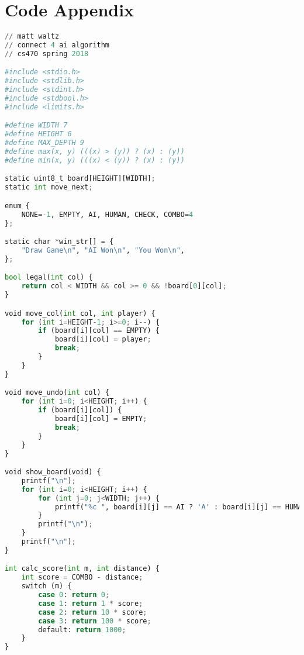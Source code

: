 \documentclass[11pt,letterpaper]{article}
\begin{document}
\section{Code Appendix}
\begin{lstlisting}[language=Python]
// matt waltz
// connect 4 ai algorithm
// cs470 spring 2018

#include <stdio.h>
#include <stdlib.h>
#include <stdint.h>
#include <stdbool.h>
#include <limits.h>

#define WIDTH 7
#define HEIGHT 6
#define MAX_DEPTH 9
#define max(x, y) (((x) > (y)) ? (x) : (y))
#define min(x, y) (((x) < (y)) ? (x) : (y))

static uint8_t board[HEIGHT][WIDTH];
static int move_next;

enum {
    NONE=-1, EMPTY, AI, HUMAN, CHECK, COMBO=4
};

static char *win_str[] = {
    "Draw Game\n", "AI Won\n", "You Won\n",
};

bool legal(int col) {
    return col < WIDTH && col >= 0 && !board[0][col];
}

void move_col(int col, int player) {
    for (int i=HEIGHT-1; i>=0; i--) {
        if (board[i][col] == EMPTY) {
            board[i][col] = player;
            break;
        }
    }
}

void move_undo(int col) {
    for (int i=0; i<HEIGHT; i++) {
        if (board[i][col]) {
            board[i][col] = EMPTY;
            break;
        }
    }
}

void show_board(void) {
    printf("\n");
    for (int i=0; i<HEIGHT; i++) {
        for (int j=0; j<WIDTH; j++) {
            printf("%c ", board[i][j] == AI ? 'A' : board[i][j] == HUMAN ? 'H' : 'O');
        }
        printf("\n");
    }
    printf("\n");
}

int calc_score(int m, int distance) {
    int score = COMBO - distance;
    switch (m) {
        case 0: return 0;
        case 1: return 1 * score;
        case 2: return 10 * score;
        case 3: return 100 * score;
        default: return 1000;
    }
}


\end{lstlisting}
\end{document}
